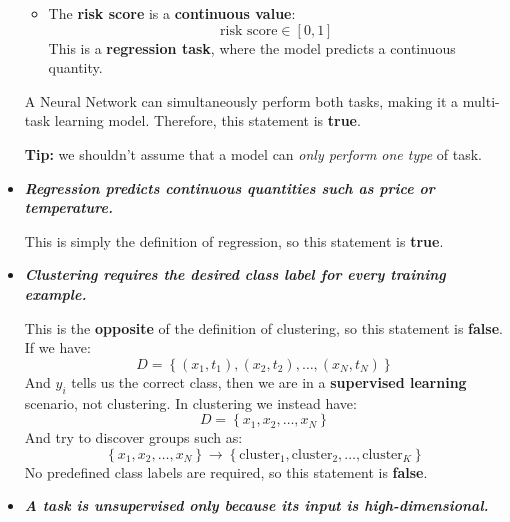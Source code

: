 \begin{itemize}
\begin{itemize}
            \item The \textbf{risk score} is a \textbf{continuous value}:
                \begin{equation*}
                    \text{risk score} \in [0, 1]
                \end{equation*}
                This is a \textbf{regression task}, where the model predicts a continuous quantity.
        \end{itemize}
        A Neural Network can simultaneously perform both tasks, making it a multi-task learning model. Therefore, this statement is \textbf{true}.

        \textcolor{Green3}{ \textbf{Tip:}} we shouldn't assume that a model can \emph{only perform one type} of task.

    \item[\textcolor{Green3}{\faIcon{check}}] \textcolor{Green3}{\textbf{\emph{Regression predicts continuous quantities such as price or temperature.}}}

        This is simply the definition of regression, so this statement is \textbf{true}.

    \item[\textcolor{Red2}{\faIcon{times}}] \textcolor{Red2}{\textbf{\emph{Clustering requires the desired class label for every training example.}}}

        This is the \textbf{opposite} of the definition of clustering, so this statement is \textbf{false}. If we have:
        \begin{equation*}
            D = \left\{(x_1, t_1), (x_2, t_2), \ldots, (x_N, t_N)\right\}
        \end{equation*}
        And $y_i$ tells us the correct class, then we are in a \textbf{supervised learning} scenario, not clustering. In clustering we instead have:
        \begin{equation*}
            D = \left\{x_1, x_2, \ldots, x_N\right\}
        \end{equation*}
        And try to discover groups such as:
        \begin{equation*}
            \left\{x_1, x_2, \ldots, x_N\right\} \to \left\{\text{cluster}_{1}, \text{cluster}_{2}, \ldots, \text{cluster}_{K}\right\}
        \end{equation*}
        No predefined class labels are required, so this statement is \textbf{false}.

    \item[\textcolor{Red2}{\faIcon{times}}] \textcolor{Red2}{\textbf{\emph{A task is unsupervised only because its input is high-dimen\break{}sional.}}}


\end{itemize}
